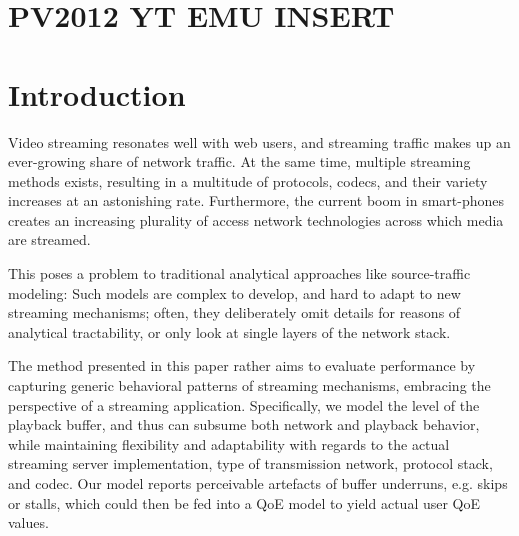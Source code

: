 \section{PV2012 YT EMU INSERT}
\section{Introduction}
\label{sec:introduction-PV}

Video streaming resonates well with web users, and streaming traffic makes up an ever-growing share of network traffic. At the same time, multiple streaming methods exists, resulting in a multitude of protocols, codecs, and their variety increases at an astonishing rate. Furthermore, the current boom in smart-phones creates an increasing plurality of access network technologies across which media are streamed.

This poses a problem to traditional analytical approaches like source-traffic modeling: Such models are complex to develop, and hard to adapt to new streaming mechanisms; often, they deliberately omit details for reasons of analytical tractability, or only look at single layers of the network stack.

The method presented in this paper rather aims to evaluate performance by capturing generic behavioral patterns of streaming mechanisms, embracing the perspective of a streaming application. Specifically, we model the level of the playback buffer, and thus can subsume both network and playback behavior, while maintaining flexibility and adaptability with regards to the actual streaming server implementation, type of transmission network, protocol stack, and codec. Our model reports perceivable artefacts of buffer underruns, e.g. skips or stalls, which could then be fed into a QoE model to yield actual user QoE values.\\





